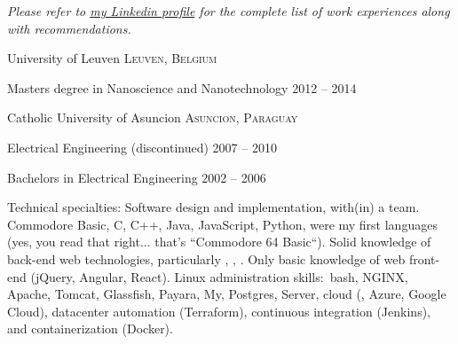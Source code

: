 \documentclass[10pt,a4paper]{article} %
\begin{document}

\begin{center}
\textit{Please refer to \href{http://www.linkedin.com/in/lugaramirez}{my Linkedin profile} for the complete list of work experiences along with recommendations.}
\end{center}


\spacedhrule{-0.2em}{-0.4em} %



\headedsection %
{University of Leuven}
{\textsc{Leuven, Belgium}} {

\headedsubsection %
{Masters degree in Nanoscience and Nanotechnology}
{2012 -- 2014}
{}
}


\headedsection %
{Catholic University of Asuncion}
{\textsc{Asuncion, Paraguay}} {

\headedsubsection %
{Electrical Engineering \textnormal{(discontinued)}}
{2007 -- 2010} {}

\headedsubsection %
{Bachelors in Electrical Engineering}
{2002 -- 2006} {}
}

\spacedhrule{0.5em}{-0.4em} %



\inlineheadsection %
{Technical specialties:}
{Software design and implementation, with(in) a team. Commodore Basic, C, C++, Java, JavaScript, Python, were my first languages (yes, you read that right... that's ``Commodore 64 Basic``). Solid knowledge of back-end web technologies, particularly , , . Only basic knowledge of web front-end (jQuery, Angular, React). Linux administration skills:\ bash, NGINX, Apache, Tomcat, Glassfish, Payara, My, Postgres, Server, cloud (, Azure, Google Cloud), datacenter automation (Terraform), continuous integration (Jenkins), and containerization (Docker).}
\end{document}
